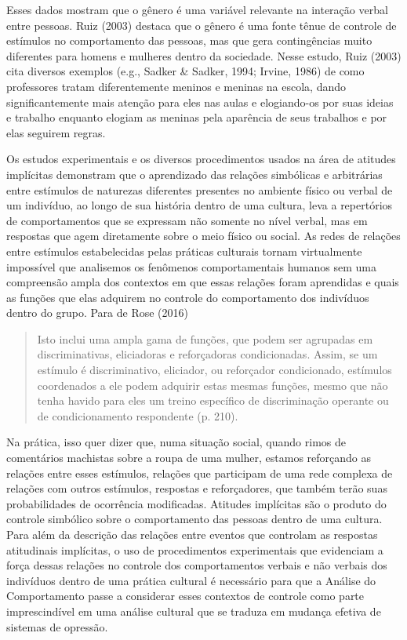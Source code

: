 Esses dados mostram que o gênero é uma variável relevante na interação verbal entre pessoas. Ruiz (2003) destaca que o gênero é uma fonte tênue de controle de estímulos no comportamento das pessoas, mas que gera contingências muito diferentes para homens e mulheres dentro da sociedade. Nesse estudo, Ruiz (2003) cita diversos exemplos (e.g., Sadker \& Sadker, 1994; Irvine, 1986) de como professores tratam diferentemente meninos e meninas na escola, dando significantemente mais atenção para eles nas aulas e elogiando-os por suas ideias e trabalho enquanto elogiam as meninas pela aparência de seus trabalhos e por elas seguirem regras.

Os estudos experimentais e os diversos procedimentos usados na área de atitudes implícitas demonstram que o aprendizado das relações simbólicas e arbitrárias entre estímulos de naturezas diferentes presentes no ambiente físico ou verbal de um indivíduo, ao longo de sua história dentro de uma cultura, leva a repertórios de comportamentos que se expressam não somente no nível verbal, mas em respostas que agem diretamente sobre o meio físico ou social. As redes de relações entre estímulos estabelecidas pelas práticas culturais tornam virtualmente impossível que analisemos os fenômenos comportamentais humanos sem uma compreensão ampla dos contextos em que essas relações foram aprendidas e quais as funções que elas adquirem no controle do comportamento dos indivíduos dentro do grupo. Para de Rose (2016) 

\begin{quote}
    Isto inclui uma ampla gama de funções, que podem ser agrupadas em discriminativas, eliciadoras e reforçadoras condicionadas. Assim, se um estímulo é discriminativo, eliciador, ou reforçador condicionado, estímulos coordenados a ele podem adquirir estas mesmas funções, mesmo que não tenha havido para eles um treino específico de discriminação operante ou de condicionamento respondente (p. 210).
\end{quote}

Na prática, isso quer dizer que, numa situação social, quando rimos de comentários machistas sobre a roupa de uma mulher, estamos reforçando as relações entre esses estímulos, relações que participam de uma rede complexa de relações com outros estímulos, respostas e reforçadores, que também terão suas probabilidades de ocorrência modificadas. Atitudes implícitas são o produto do controle simbólico sobre o comportamento das pessoas dentro de uma cultura. Para além da descrição das relações entre eventos que controlam as respostas atitudinais implícitas, o uso de procedimentos experimentais que evidenciam a força dessas relações no controle dos comportamentos verbais e não verbais dos indivíduos dentro de uma prática cultural é necessário para que a Análise do Comportamento passe a considerar esses contextos de controle como parte imprescindível em uma análise cultural que se traduza em mudança efetiva de sistemas de opressão.
\vfill
\pagebreak
